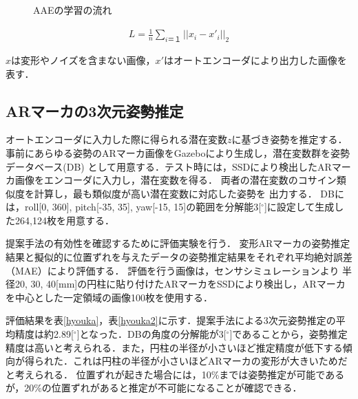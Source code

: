 \documentclass{jsarticle}
\begin{document}
\begin{figure}[ht]
\vspace{-1zh}
\setlength{\epsfxsize}{7.5cm}
\centerline{}
\vspace{0zh}
\caption{AAEの学習の流れ}
\label{BB}
\vspace{-2zh}
\end{figure}


\begin{eqnarray}
\label{sonsitu}
L=\frac{1}{n}\sum_{i＝１} ||x_i-x'_i||_2
\end{eqnarray}

$x$は変形やノイズを含まない画像，$x'$はオートエンコーダにより出力した画像を表す．




\subsection{ARマーカの3次元姿勢推定}
オートエンコーダに入力した際に得られる潜在変数$z$に基づき姿勢を推定する．
事前にあらゆる姿勢のARマーカ画像をGazeboにより生成し，潜在変数群を姿勢データベース(DB)
として用意する．テスト時には，SSDにより検出したARマーカ画像をエンコーダに入力し，潜在変数を得る．
両者の潜在変数のコサイン類似度を計算し，最も類似度が高い潜在変数に対応した姿勢を
出力する．
DBには，roll[0, 360], pitch[-35, 35], yaw[-15, 15]の範囲を分解能3[$^\circ$]に設定して生成した264,124枚を用意する．









提案手法の有効性を確認するために評価実験を行う．
変形ARマーカの姿勢推定結果と擬似的に位置ずれを与えたデータの姿勢推定結果をそれぞれ平均絶対誤差（MAE）により評価する．
評価を行う画像は，センサシミュレーションより	
半径20, 30, 40[mm]の円柱に貼り付けたARマーカをSSDにより検出し，ARマーカを中心とした一定領域の画像100枚を使用する．

評価結果を表\ref{hyouka}，表\ref{hyouka2}に示す．提案手法による3次元姿勢推定の平均精度は約2.89[$^\circ$]となった．DBの角度の分解能が3[$^\circ$]であることから，姿勢推定精度は高いと考えられる．また，円柱の半径が小さいほど推定精度が低下する傾向が得られた．これは円柱の半径が小さいほどARマーカの変形が大きいためだと考えられる．
位置ずれが起きた場合には，10\%までは姿勢推定が可能であるが，20\%の位置ずれがあると推定が不可能になることが確認できる．
\end{document}
